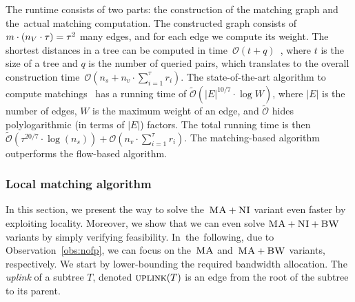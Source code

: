 The runtime consists of two parts: the construction of the matching graph and
the~actual matching computation. The constructed graph consists of
$m \cdot (n_V \cdot \tau) = \tau^2$
many edges,
and for each edge we compute its weight. The shortest distances
in a tree can be computed in time~$\mathcal{O}(t + q)$~\cite{offline-lca}, where $t$ is the size of a tree and $q$ is the number of queried pairs, which translates to the overall construction time~$\mathcal{O}(n_s + n_v\cdot \sum_{i=1}^\tau r_i)$.
The state-of-the-art algorithm to compute matchings~\cite{matching-best} has a running time of $\tilde{\mathcal{O}}(|E|^{10/7}\cdot \log W)$, where $|E|$ is the number of edges, $W$ is the maximum weight of an edge, and $\tilde{\mathcal{O}}$ hides polylogarithmic (in terms of $|E|$) factors.
The total running time is then $\tilde{\mathcal{O}}(\tau^{20/7}\cdot \log(n_s)) + \mathcal{O}(n_v\cdot \sum_{i=1}^\tau r_i)$.
The matching-based algorithm outperforms the flow-based algorithm.


\subsubsection{Local matching algorithm}

In this section, we present the way to solve the~$\textsc{MA}+\textsc{NI}$ variant even faster by exploiting
locality. Moreover, we show that we can
even solve
$\textsc{MA}+\textsc{NI}+\textsc{BW}$ variants by simply
verifying feasibility.
In~the~following, due to Observation~\ref{obs:nofp}, we can focus on
the~$\textsc{MA}$ and~$\textsc{MA}+\textsc{BW}$ variants, respectively.
We start by lower-bounding the required bandwidth allocation.
The \emph{uplink} of a subtree $T$, denoted $\textsc{uplink}(T)$ is an edge from the root of the subtree to its parent.

%
%


